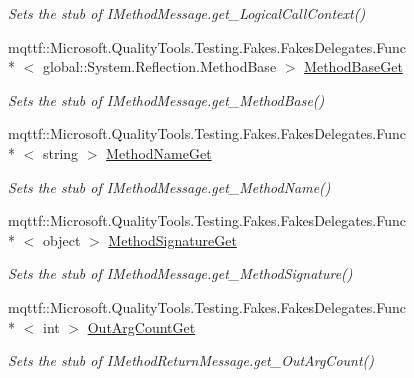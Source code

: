 \begin{DoxyCompactItemize}
\begin{DoxyCompactList}\small\item\em Sets the stub of I\-Method\-Message.\-get\-\_\-\-Logical\-Call\-Context()\end{DoxyCompactList}\item 
mqttf\-::\-Microsoft.\-Quality\-Tools.\-Testing.\-Fakes.\-Fakes\-Delegates.\-Func\\*
$<$ global\-::\-System.\-Reflection.\-Method\-Base $>$ \hyperlink{class_system_1_1_runtime_1_1_remoting_1_1_activation_1_1_fakes_1_1_stub_i_construction_return_message_abca65021ab7cc75c05a51c53247b3bbe}{Method\-Base\-Get}
\begin{DoxyCompactList}\small\item\em Sets the stub of I\-Method\-Message.\-get\-\_\-\-Method\-Base()\end{DoxyCompactList}\item 
mqttf\-::\-Microsoft.\-Quality\-Tools.\-Testing.\-Fakes.\-Fakes\-Delegates.\-Func\\*
$<$ string $>$ \hyperlink{class_system_1_1_runtime_1_1_remoting_1_1_activation_1_1_fakes_1_1_stub_i_construction_return_message_a6d7b0b46d3a5b9700d59551b3bd1256d}{Method\-Name\-Get}
\begin{DoxyCompactList}\small\item\em Sets the stub of I\-Method\-Message.\-get\-\_\-\-Method\-Name()\end{DoxyCompactList}\item 
mqttf\-::\-Microsoft.\-Quality\-Tools.\-Testing.\-Fakes.\-Fakes\-Delegates.\-Func\\*
$<$ object $>$ \hyperlink{class_system_1_1_runtime_1_1_remoting_1_1_activation_1_1_fakes_1_1_stub_i_construction_return_message_ad4dea8741de5a1aff4788774816f3692}{Method\-Signature\-Get}
\begin{DoxyCompactList}\small\item\em Sets the stub of I\-Method\-Message.\-get\-\_\-\-Method\-Signature()\end{DoxyCompactList}\item 
mqttf\-::\-Microsoft.\-Quality\-Tools.\-Testing.\-Fakes.\-Fakes\-Delegates.\-Func\\*
$<$ int $>$ \hyperlink{class_system_1_1_runtime_1_1_remoting_1_1_activation_1_1_fakes_1_1_stub_i_construction_return_message_a34f226229656bc11a1b75cf1b7a2d281}{Out\-Arg\-Count\-Get}
\begin{DoxyCompactList}\small\item\em Sets the stub of I\-Method\-Return\-Message.\-get\-\_\-\-Out\-Arg\-Count()\end{DoxyCompactList}\item 

\end{DoxyCompactItemize}
